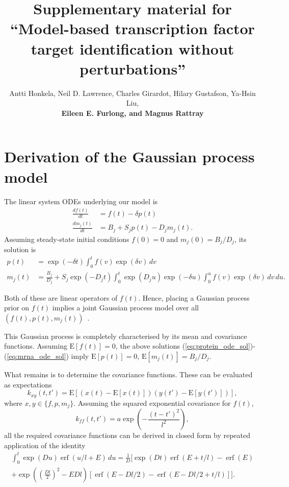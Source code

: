 \documentclass{article}
\title{Supplementary material for ``Model-based transcription factor
  target identification without perturbations''}
\author{
Antti Honkela,
Neil D. Lawrence,
Charles Girardot, 
Hilary Gustafson,
Ya-Hsin Liu,\\
\bf Eileen E. Furlong, and
Magnus Rattray
}
\newcommand{\erf}{\operatorname{erf}}
\begin{document}
\maketitle


\section{Derivation of the Gaussian process model}

The linear system ODEs underlying our model is
\begin{align}
  \label{eq:translation_ode}
  \frac{df(t)}{dt} & = f(t) - \delta p(t) \\
  \label{eq:translation_ode}
  \frac{dm_j(t)}{dt} & = B_j + S_j p(t) - D_j m_j(t).
\end{align}
Assuming steady-state initial conditions $f(0) = 0$ and
$m_j(0) = B_j / D_j$, its solution is
\begin{align}
  \label{eq:protein_ode_sol}
  p(t) & = \exp(-\delta t) \int_0^t f(v) \exp(\delta v) \, dv \\
  \label{eq:mrna_ode_sol}
  m_j(t) & = \frac{B_j}{D_j} + S_j \exp(-D_j t) \int_0^t \exp(D_j
  u) \exp(-\delta u) \int_0^u f(v) \exp(\delta v) \, dv \, du.
\end{align}

Both of these are linear operators of $f(t)$.  Hence, placing a
Gaussian process prior on $f(t)$ implies a joint Gaussian process
model over all $(f(t), p(t), m_j(t))$~\cite{Rasmussen2006}.

This Gaussian process is completely characterised by its mean and
covariance functions.  Assuming $\mathrm{E}[f(t)] = 0$, the above
solutions (\ref{eq:protein_ode_sol})-(\ref{eq:mrna_ode_sol}) imply
$\mathrm{E}[p(t)] = 0$, $\mathrm{E}[m_j(t)] = B_j / D_j$.

What remains is to determine the covariance functions.  These can
be evaluated as expectations
\begin{equation}
  \label{eq:kernel_definition}
  k_{xy}(t,t') = \mathrm{E}[(x(t) - \mathrm{E}[x(t)])(y(t') - \mathrm{E}[y(t')])],
\end{equation}
where $x,y \in \{f, p, m_j\}$.  Assuming the squared exponential
covariance for $f(t)$,
\begin{equation}
  \label{eq:sqexp_kernel}
  k_{ff}(t, t') = a \exp\left( -\frac{(t-t')^2}{l^2} \right),
\end{equation}
all the required covariance functions can be derived in closed form
by repeated application of the identity
\begin{multline}
  \label{eq:gpsim_identity}
  \int_0^t \exp(D u) \erf(u/l + E)\,du =
  \frac{1}{D} \bigg[
  \exp(Dt) \erf(E + t/l) - \erf(E) \\
  + \exp\left(\left( \frac{Dl}{2}\right)^2 -E Dl \right)
  [ \erf(E - Dl/2) - \erf(E-Dl/2+t/l) ]
  \bigg].
\end{multline}
\end{document}
